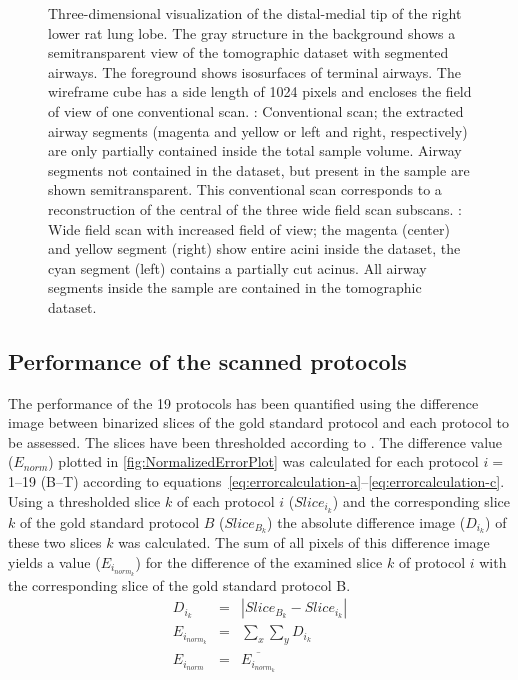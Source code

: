 \begin{figure}[p]
{{%
			\label{subfig:convvswfs_wfs}%
		}%
	}%
	\caption[\threed visualization of the tip of a rat lung lobe]{Three-dimensional visualization of the distal-medial tip of the right lower rat lung lobe. The gray structure in the background shows a semitransparent view of the tomographic dataset with segmented airways. The foreground shows isosurfaces of terminal airways. The wireframe cube has a side length of 1024 pixels and encloses the field of view of one conventional scan. %
	: Conventional scan; the extracted airway segments (magenta and yellow or left and right, respectively) are only partially contained inside the total sample volume. Airway segments not contained in the dataset, but present in the sample are shown semitransparent. This conventional scan corresponds to a reconstruction of the central of the three wide field scan subscans. %
	: Wide field scan with increased field of view; the magenta (center) and yellow segment (right) show entire acini inside the dataset, the cyan segment (left) contains a partially cut acinus. All airway segments inside the sample are contained in the tomographic dataset.}
	\label{fig:s2-wfs}
\end{figure}%

\subsection{Performance of the scanned protocols}
The performance of the 19 protocols has been quantified using the difference image between binarized slices of the gold standard protocol and each protocol to be assessed. The slices have been thresholded according to \citet{Otsu1979}. The difference value ($E_{norm}$) plotted in \autoref{fig:NormalizedErrorPlot} was calculated for each protocol $i=$1--19 (B--T) according to equations~\ref{eq:errorcalculation-a}--\ref{eq:errorcalculation-c}. Using a thresholded slice $k$ of each protocol $i$ ($Slice_{i_{k}}$) and the corresponding slice $k$ of the gold standard protocol $B$ ($Slice_{B_{k}}$) the absolute difference image ($D_{i_{k}}$) of these two slices $k$ was calculated. The sum of all pixels of this difference image yields a value ($E_{i_{norm_{k}}}$) for the difference of the examined slice $k$ of protocol $i$ with the corresponding slice of the gold standard protocol B.
\begin{eqnarray}
	D_{i_{k}} &=& |Slice_{B_{k}}-Slice_{i_{k}}|\label{eq:errorcalculation-a}\\%
	E_{i_{norm_{k}}} &=& \sum_{x}\sum_{y} D_{i_{k}}\label{eq:errorcalculation-b}\\%
	E_{i_{norm}} &=& \overline{E_{i_{norm_{k}}}}\label{eq:errorcalculation-c}%
\end{eqnarray}

